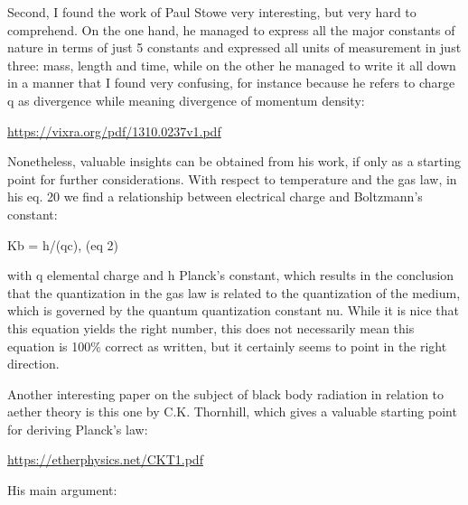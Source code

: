 \documentclass[a4paper]{article}
\newcommand\textstyleNone[1]{#1}
\begin{document}
{\color[rgb]{0.101960786,0.101960786,0.101960786}
\textstyleNone{Second, I found the work of Paul Stowe very interesting, but very hard to comprehend. On the one hand, he
managed to express all the major constants of nature in terms of just 5 constants and expressed all units of
measurement in just three: mass, length and time, while on the other he managed to write it all down in a manner that I
found very confusing, for instance because he refers to charge q as {\textquotedbl}divergence{\textquotedbl} while
meaning {\textquotedbl}divergence of momentum density{\textquotedbl}:}}

{\color[rgb]{0.101960786,0.101960786,0.101960786}
\url{https://vixra.org/pdf/1310.0237v1.pdf}\textstyleNone{ }}

{\color[rgb]{0.101960786,0.101960786,0.101960786}
\textstyleNone{Nonetheless, valuable insights can be obtained from his work, if only as a starting point for further
considerations. With respect to temperature and the gas law, in his eq. 20 we find a relationship between electrical
charge and Boltzmann's constant: }}

{\color[rgb]{0.101960786,0.101960786,0.101960786}
\textstyleNone{Kb = h/(qc), (eq 2)}}

{\color[rgb]{0.101960786,0.101960786,0.101960786}
\textstyleNone{with q elemental charge and h Planck's constant, which results in the conclusion that the quantization in
the gas law is related to the quantization of the medium, which is governed by the quantum quantization constant nu.
While it is nice that this equation yields the right number, this does not necessarily mean this equation is 100\%
correct as written, but it certainly seems to point in the right direction. }}

{\color[rgb]{0.101960786,0.101960786,0.101960786}
\textstyleNone{Another interesting paper on the subject of black body radiation in relation to aether theory is this one
by C.K. Thornhill, which gives a valuable starting point for deriving Planck's law:}}

{\color[rgb]{0.101960786,0.101960786,0.101960786}
\url{https://etherphysics.net/CKT1.pdf}\textstyleNone{ }}

{\color[rgb]{0.101960786,0.101960786,0.101960786}
\textstyleNone{His main argument:}}
\end{document}
